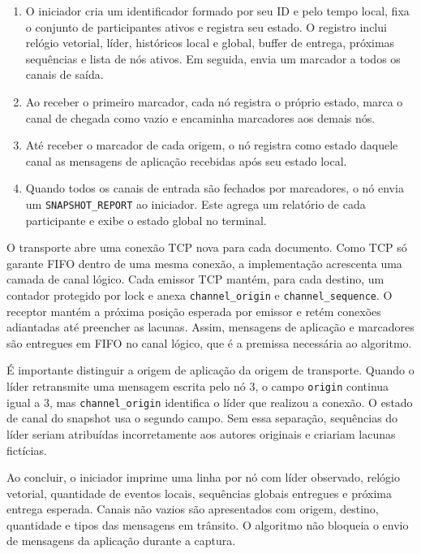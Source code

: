 \begin{enumerate}
    \item O iniciador cria um identificador formado por seu ID e pelo tempo local,
    fixa o conjunto de participantes ativos e registra seu estado. O registro inclui
    relógio vetorial, líder, históricos local e global, buffer de entrega, próximas
    sequências e lista de nós ativos. Em seguida, envia um marcador a todos os
    canais de saída.
    \item Ao receber o primeiro marcador, cada nó registra o próprio estado, marca
    o canal de chegada como vazio e encaminha marcadores aos demais nós.
    \item Até receber o marcador de cada origem, o nó registra como estado daquele
    canal as mensagens de aplicação recebidas após seu estado local.
    \item Quando todos os canais de entrada são fechados por marcadores, o nó envia
    um \texttt{SNAPSHOT\_REPORT} ao iniciador. Este agrega um relatório de cada
    participante e exibe o estado global no terminal.
\end{enumerate}

O transporte abre uma conexão TCP nova para cada documento. Como TCP só garante
FIFO dentro de uma mesma conexão, a implementação acrescenta uma camada de canal
lógico. Cada emissor TCP mantém, para cada destino, um contador protegido por lock
e anexa \texttt{channel\_origin} e \texttt{channel\_sequence}. O receptor mantém a
próxima posição esperada por emissor e retém conexões adiantadas até preencher as
lacunas. Assim, mensagens de aplicação e marcadores são entregues em FIFO no canal
lógico, que é a premissa necessária ao algoritmo.

É importante distinguir a origem de aplicação da origem de transporte. Quando o
líder retransmite uma mensagem escrita pelo nó 3, o campo \texttt{origin} continua
igual a 3, mas \texttt{channel\_origin} identifica o líder que realizou a conexão.
O estado de canal do snapshot usa o segundo campo. Sem essa separação, sequências
do líder seriam atribuídas incorretamente aos autores originais e criariam lacunas
fictícias.

Ao concluir, o iniciador imprime uma linha por nó com líder observado, relógio
vetorial, quantidade de eventos locais, sequências globais entregues e próxima
entrega esperada. Canais não vazios são apresentados com origem, destino,
quantidade e tipos das mensagens em trânsito. O algoritmo não bloqueia o envio de
mensagens da aplicação durante a captura.
